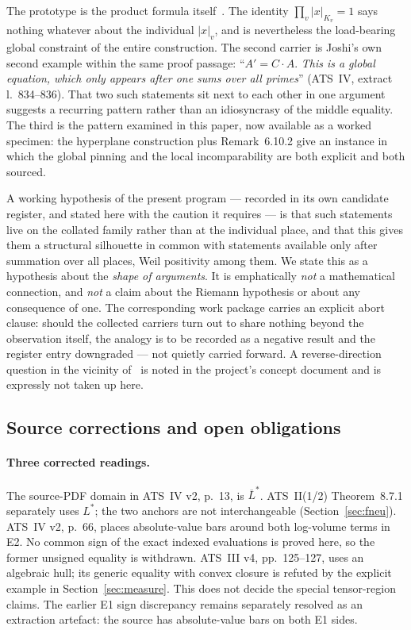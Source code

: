 \documentclass[11pt,a4paper]{article}
\theoremstyle{definition}
\theoremstyle{plain}
\theoremstyle{definition}
\newcommand{\anchor}[2]{(#1, extract l.~#2)}
\begin{document}
The prototype is the product formula itself~\cite{ArtinWhaples1945}. The identity
$\prod_v |x|_{K_v} = 1$ says nothing whatever about the individual $|x|_v$, and is
nevertheless the load-bearing global constraint of the entire construction. The
second carrier is Joshi's own second example within the same proof passage:
``$A' = C \cdot A$. \emph{This is a global equation, which only appears after one
sums over all primes}'' \anchor{ATS~IV}{834--836}. That two such statements sit
next to each other in one argument suggests a recurring pattern rather than an
idiosyncrasy of the middle equality. The third is the pattern examined in this
paper, now available as a worked specimen: the hyperplane construction plus
Remark~6.10.2 give an instance in which the global pinning and the local
incomparability are both explicit and both sourced.

A working hypothesis of the present program --- recorded in its own candidate
register, and stated here with the caution it requires --- is that such statements
live on the collated family rather than at the individual place, and that this
gives them a structural silhouette in common with statements available only after
summation over all places, Weil positivity among them. We state this as a
hypothesis about the \emph{shape of arguments}. It is emphatically \emph{not} a
mathematical connection, and \emph{not} a claim about the Riemann hypothesis or
about any consequence of one. The corresponding work package carries an explicit
abort clause: should the collected carriers turn out to share nothing beyond the
observation itself, the analogy is to be recorded as a negative result and the
register entry downgraded --- not quietly carried forward. A reverse-direction
question in the vicinity of~\cite{GranvilleStark2000} is noted in the project's
concept document and is expressly not taken up here.

\subsection{Source corrections and open obligations}
\label{sec:residues}

\paragraph{Three corrected readings.}
The source-PDF domain in ATS~IV v2, p.~13, is $\overline L^*$.
ATS~II(1/2) Theorem~8.7.1 separately uses $L^*$; the two anchors
are not interchangeable (Section~\ref{sec:fneu}).
ATS~IV v2, p.~66, places absolute-value bars around both log-volume
terms in E2. No common sign of the exact indexed evaluations is proved
here, so the former unsigned equality is withdrawn.
ATS~III v4, pp.~125--127, uses an algebraic hull; its generic equality
with convex closure is refuted by the explicit example in
Section~\ref{sec:measure}. This does not decide the special tensor-region
claims. The earlier E1 sign discrepancy remains separately resolved as an
extraction artefact: the source has absolute-value bars on both E1 sides.
\end{document}
